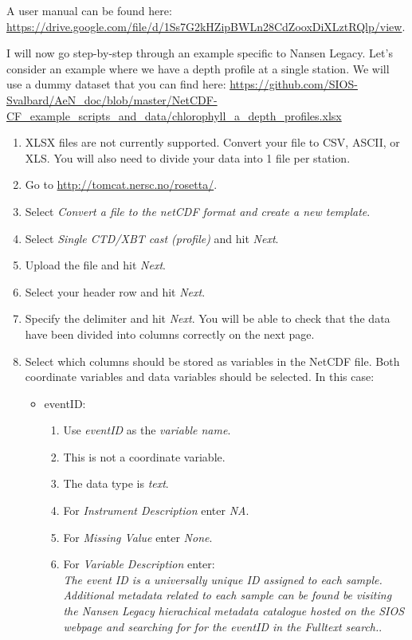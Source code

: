 \documentclass[a4paper,english, 11pt]{article}
\begin{document}
A user manual can be found here:\\
\url{https://drive.google.com/file/d/1Ss7G2kHZipBWLn28CdZooxDiXLztRQlp/view}.

I will now go step-by-step through an example specific to Nansen Legacy. Let's consider an example where we have a depth profile at a single station. We will use a dummy dataset that you can find here:
\url{https://github.com/SIOS-Svalbard/AeN_doc/blob/master/NetCDF-CF_example_scripts_and_data/chlorophyll_a_depth_profiles.xlsx}

\begin{enumerate}
\item XLSX files are not currently supported. Convert your file to CSV, ASCII, or XLS. You will also need to divide your data into 1 file per station.
\item Go to \url{http://tomcat.nersc.no/rosetta/}.
\item Select \textit{Convert a file to the netCDF format and create a new template}.
\item Select \textit{Single CTD/XBT cast (profile)} and hit \textit{Next}.
\item Upload the file and hit \textit{Next}.
\item Select your header row and hit \textit{Next}.
\item Specify the delimiter and hit \textit{Next}. You will be able to check that the data have been divided into columns correctly on the next page.
\item Select which columns should be stored as variables in the NetCDF file. Both coordinate variables and data variables should be selected. In this case:
\begin{itemize}
\item eventID:
\begin{enumerate}
\item Use \textit{eventID} as the \textit{variable name}.
\item This is not a coordinate variable.
\item The data type is \textit{text}. 
\item For \textit{Instrument Description} enter \textit{NA}.
\item For \textit{Missing Value} enter \textit{None}.
\item For \textit{Variable Description} enter:\\
\textit{The event ID is a universally unique ID assigned to each sample. Additional metadata related to each sample can be found be visiting the Nansen Legacy hierachical metadata catalogue hosted on the SIOS webpage and searching for for the eventID in the Fulltext search.}.

\end{enumerate}
\end{itemize}
\end{enumerate}
\end{document}
